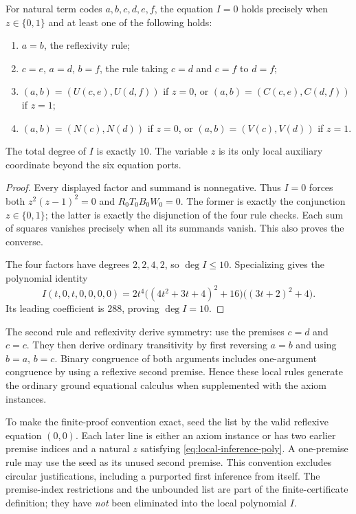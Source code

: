 \documentclass[11pt,a4paper]{article}
\theoremstyle{definition}
\begin{document}
\begin{auxsyntaxprop}
For natural term codes $a,b,c,d,e,f$, the equation $I=0$ holds precisely
when $z\in\{0,1\}$ and at least one of the following holds:
\begin{enumerate}
 \item $a=b$, the reflexivity rule;
 \item $c=e$, $a=d$, $b=f$, the rule taking $c=d$ and $c=f$ to $d=f$;
 \item $(a,b)=(U(c,e),U(d,f))$ if $z=0$, or
       $(a,b)=(C(c,e),C(d,f))$ if $z=1$;
 \item $(a,b)=(N(c),N(d))$ if $z=0$, or
       $(a,b)=(V(c),V(d))$ if $z=1$.
\end{enumerate}
The total degree of $I$ is exactly $10$.  The variable $z$ is its only
local auxiliary coordinate beyond the six equation ports.
\end{auxsyntaxprop}
\begin{proof}
Every displayed factor and summand is nonnegative.  Thus $I=0$ forces
both $z^2(z-1)^2=0$ and $R_0T_0B_0W_0=0$.  The former is exactly the
conjunction $z\in\{0,1\}$; the latter is exactly the disjunction of
the four rule checks.  Each sum of squares vanishes precisely when all
its summands vanish.  This also proves the converse.

The four factors have degrees $2,2,4,2$, so $\deg I\le10$.
Specializing gives the polynomial identity
\[
 I(t,0,t,0,0,0,0)
 =2t^4\bigl((4t^2+3t+4)^2+16\bigr)
       \bigl((3t+2)^2+4\bigr).
\]
Its leading coefficient is $288$, proving $\deg I=10$.
\end{proof}

The second rule and reflexivity derive symmetry: use the premises
$c=d$ and $c=c$.  They then derive ordinary transitivity by first
reversing $a=b$ and using $b=a$, $b=c$.  Binary congruence of both
arguments includes one-argument congruence by using a reflexive second
premise.  Hence these local rules generate the ordinary ground
equational calculus when supplemented with the axiom instances.

To make the finite-proof convention exact, seed the list by the valid
reflexive equation $(0,0)$.  Each later line is either an axiom instance
or has two earlier premise indices and a natural $z$ satisfying
\eqref{eq:local-inference-poly}.  A one-premise rule may use the seed
as its unused second premise.  This convention excludes circular
justifications, including a purported first inference from itself.
The premise-index restrictions and the unbounded list are part of the
finite-certificate definition; they have \emph{not} been eliminated
into the local polynomial $I$.
\end{document}
